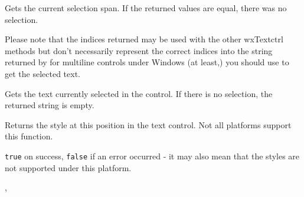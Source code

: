 \label{wxtextctrlgetselection}


Gets the current selection span. If the returned values are equal, there was
no selection.

Please note that the indices returned may be used with the other wxTextctrl
methods but don't necessarily represent the correct indices into the string
returned by  for multiline controls
under Windows (at least,) you should use
 to get the selected
text.







\label{wxtextctrlgetstringselection}


Gets the text currently selected in the control. If there is no selection, the
returned string is empty.


\label{wxtextctrlgetstyle}


Returns the style at this position in the text control. Not all platforms
support this function.


{\tt true} on success, {\tt false} if an error occurred - it may also mean that
the styles are not supported under this platform.


, 


\label{wxtextctrlgetvalue}


